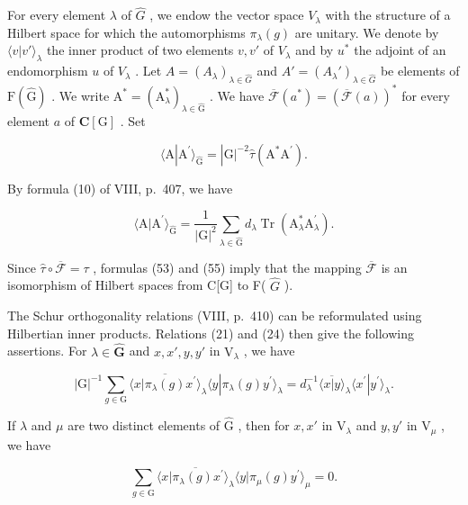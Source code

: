 For every element \(\lambda\) of \(\widehat{G}\) , we endow the vector space \(V_{\lambda}\) with the structure of a Hilbert space for which the automorphisms \(\pi_{\lambda}(g)\) are unitary. We denote by \(\langle v|v'\rangle_{\lambda}\) the inner product of two elements \(v, v'\) of \(V_{\lambda}\) and by \(u^{*}\) the adjoint of an endomorphism \(u\) of \(V_{\lambda}\) . Let \(A = (A_{\lambda})_{\lambda \in \widehat{G}}\) and \(A' = (A_{\lambda}')_{\lambda \in \widehat{G}}\) be elements of \(\mathrm{F}(\widehat{\mathrm{G}})\) . We write \(\mathrm{A}^* = (\mathrm{A}_\lambda^*)_{\lambda \in \widehat{\mathrm{G}}}\) . We have \(\overline{\mathcal{F}} (a^{*}) = (\overline{\mathcal{F}} (a))^*\) for every element \(a\) of \(\mathbf{C}[\mathrm{G}]\) . Set

\[
\langle \mathrm{A} | \mathrm{A} ^ {\prime} \rangle_ {\widehat {\mathrm{G}}} = | \mathrm{G} | ^ {- 2} \widehat {\tau} (\mathrm{A} ^ {*} \mathrm{A} ^ {\prime}).\tag{55}
\]

By formula (10) of VIII, p.~407, we have

\[
\langle \mathrm{A} | \mathrm{A} ^ {\prime} \rangle_ {\widehat {\mathrm{G}}} = \frac {1}{| \mathrm{G} | ^ {2}} \sum_ {\lambda \in \widehat {\mathrm{G}}} d _ {\lambda} \operatorname{Tr} (\mathrm{A} _ {\lambda} ^ {*} \mathrm{A} _ {\lambda} ^ {\prime}).\tag{56}
\]

Since \(\hat{\tau}\circ\overline{{\mathcal{F}}}=\tau\) , formulas (53) and (55) imply that the mapping \(\overline{{\mathcal{F}}}\) is an isomorphism of Hilbert spaces from C{[}G{]} to F( \(\widehat{G}\) ).

The Schur orthogonality relations (VIII, p.~410) can be reformulated using Hilbertian inner products. Relations (21) and (24) then give the following assertions. For \(\lambda \in \widehat{\mathbf{G}}\) and \(x, x', y, y'\) in \(\mathrm{V}_{\lambda}\) , we have

\[
| \mathrm{G} | ^ {- 1} \sum_ {g \in \mathrm{G}} \overline {{\langle x | \pi_ {\lambda} (g) x ^ {\prime} \rangle}} _ {\lambda} \langle y | \pi_ {\lambda} (g) y ^ {\prime} \rangle_ {\lambda} = d _ {\lambda} ^ {- 1} \overline {{\langle x | y \rangle}} _ {\lambda} \langle x ^ {\prime} | y ^ {\prime} \rangle_ {\lambda}.\tag{57}
\]

If \(\lambda\) and \(\mu\) are two distinct elements of \(\widehat{\mathrm{G}}\) , then for \(x, x'\) in \(\mathrm{V}_{\lambda}\) and \(y, y'\) in \(\mathrm{V}_{\mu}\) , we have

\[
\sum_ {g \in \mathrm{G}} \overline {{\langle x | \pi_ {\lambda} (g) x ^ {\prime} \rangle_ {\lambda}}} \langle y | \pi_ {\mu} (g) y ^ {\prime} \rangle_ {\mu} = 0.\tag{58}
\]

